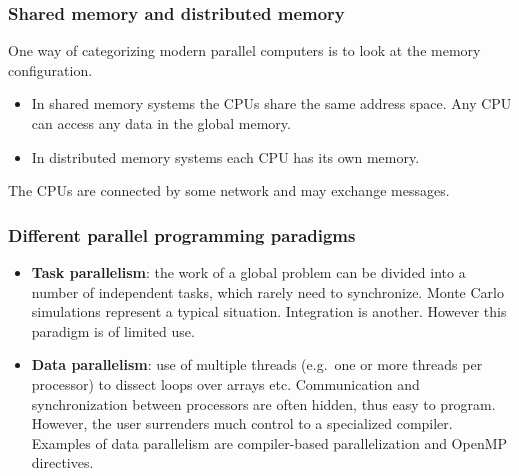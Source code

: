 \documentclass{beamer}
\begin{document}
\begin{frame}
\frametitle{Shared memory and distributed memory}

\begin{block}{}
One way of categorizing modern parallel computers is to look at the memory configuration.
\begin{itemize}
\item In shared memory systems the CPUs share the same address space. Any CPU can access any data in the global memory.

\item In distributed memory systems each CPU has its own memory.
\end{itemize}

\noindent
The CPUs are connected by some network and may exchange messages.

\end{block}
\end{frame}

\begin{frame}
\frametitle{Different parallel programming paradigms}

\begin{block}{}

\begin{itemize}
\item \textbf{Task parallelism}:  the work of a global problem can be divided into a number of independent tasks, which rarely need to synchronize.  Monte Carlo simulations represent a typical situation. Integration is another. However this paradigm is of limited use.

\item \textbf{Data parallelism}:  use of multiple threads (e.g.~one or more threads per processor) to dissect loops over arrays etc.  Communication and synchronization between processors are often hidden, thus easy to program. However, the user surrenders much control to a specialized compiler. Examples of data parallelism are compiler-based parallelization and OpenMP directives. 
\end{itemize}

\noindent
\end{block}
\end{frame}
\end{document}
